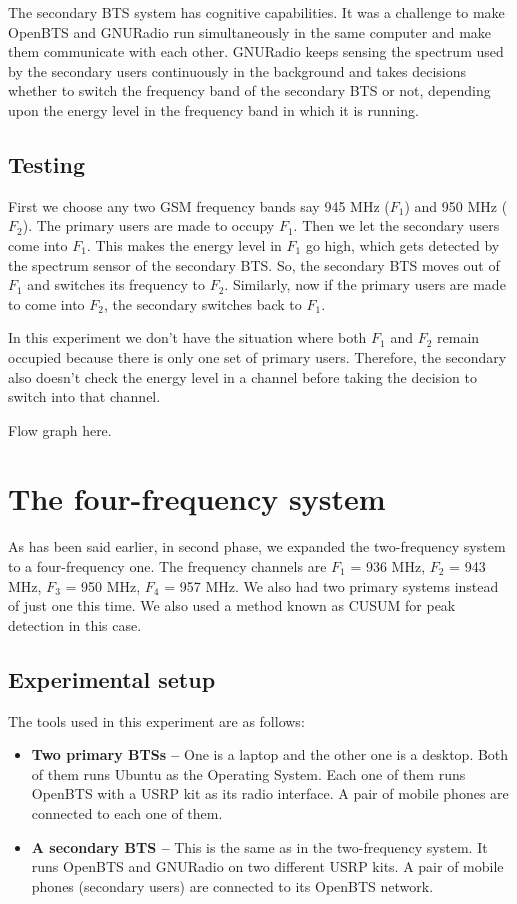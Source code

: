 The secondary BTS system has cognitive capabilities. It was a challenge to 
make OpenBTS and GNURadio run simultaneously in the same computer and make 
them communicate with each other. GNURadio keeps sensing the spectrum used by
the secondary users continuously in the background and takes decisions whether
to switch the frequency band of the secondary BTS or not, depending upon the 
energy level in the frequency band in which it is running.

\subsection{Testing}
First we choose any two GSM frequency bands say 945 MHz ($F_1$) and 950 MHz 
($F_2$). The primary users are made to occupy $F_1$. Then we let the secondary
users come into $F_1$. This makes the energy level in $F_1$ go high, which gets
detected by the spectrum sensor of the secondary BTS. So, the secondary BTS 
moves out of $F_1$ and switches its frequency to $F_2$. Similarly, now if the
primary users are made to come into $F_2$, the secondary switches back to $F_1$.

In this experiment we don't have the situation where both $F_1$ and $F_2$ remain 
occupied because there is only one set of primary users. Therefore, the 
secondary also doesn't check the energy level in a channel before taking the
decision to switch into that channel.

Flow graph here.


\section{The four-frequency system}

As has been said earlier, in second phase, we expanded the two-frequency
system to a four-frequency one. The frequency channels are $F_1$ = 936 MHz, $F_2$ =
943 MHz, $F_3$ = 950 MHz, $F_4$ = 957 MHz.
We also had two primary systems instead of just one this time.
We also used a method known as CUSUM for peak
detection in this case.
\subsection{Experimental setup}
The tools used in this experiment are as follows:
\begin{itemize}
    \item \textbf{Two primary BTSs --} One is a laptop and the other one is a
    desktop. Both of them runs Ubuntu as the Operating System. Each one of
    them runs OpenBTS with a USRP kit as its radio interface. A pair of mobile
    phones are connected to each one of them.
    \item \textbf{A secondary BTS --} This is the same as in the 
    two-frequency system. It runs OpenBTS and GNURadio on two different USRP
    kits. A pair of mobile phones (secondary users) are connected to its
    OpenBTS network.
\end{itemize}

